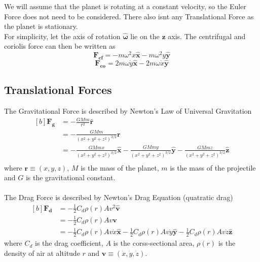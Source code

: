 \documentclass[12pt]{article}
\newcommand{\bs}[1]{\boldsymbol{#1}}
\newcommand{\om}{\omega}
\begin{document}
We will assume that the planet is rotating at a constant velocity, so the Euler Force does not need to be considered. There also isnt any Translational Force as the planet is stationary.\\
For simplicity, let the axis of rotation $\bs{\hat{\om}}$ lie on the $\bs{z}$ axis. The centrifugal and coriolis force can then be written as 
\begin{equation} \bs{F_{cf}} = -m\om^2x\bs{\hat{x}} - m\om^2y\bs{\hat{y}} \end{equation}
\begin{equation} \bs{F_{co}} = 2m\om\dot{y}\bs{\hat{x}} - 2m\om\dot{x}\bs{\hat{y}}\end{equation}

\subsection{Translational Forces}
The Gravitational Force is described by Newton's Law of Universal Gravitation
\begin{equation}
\begin{aligned}[b]
\bs{F_g} &= -\frac{GMm}{r^2}\bs{\hat{r}}\\
&= -\frac{GMm}{(x^2+y^2+z^2)^{3/2}}\bs{r}\\
&= -\frac{GMmx}{(x^2+y^2+z^2)^{3/2}}\bs{\hat{x}} -\frac{GMmy}{(x^2+y^2+z^2)^{3/2}}\bs{\hat{y}} -\frac{GMmz}{(x^2+y^2+z^2)^{3/2}}\bs{\hat{z}}\\
\end{aligned}
\end{equation}
where $\bs{r} \equiv (x, y, z)$, $M$ is the mass of the planet, $m$ is the mass of the projectile and $G$ is the gravitational constant.\\
\\
The Drag Force is described by Newton's Drag Equation (quatratic drag)
\begin{equation}
\begin{aligned}[b]
\bs{F_d} &= -\frac{1}{2}C_d\rho(r)Av^2\bs{\hat{v}}\\
&= -\frac{1}{2}C_d\rho(r)Av\bs{v}\\
&= -\frac{1}{2}C_d\rho(r)Av\dot{x}\bs{\hat{x}} - \frac{1}{2}C_d\rho(r)Av\dot{y}\bs{\hat{y}} - \frac{1}{2}C_d\rho(r)Av\dot{z}\bs{\hat{z}}
\end{aligned}
\end{equation}
where $C_d$ is the drag coefficient, $A$ is the corss-sectional area, $\rho(r)$ is the density of air at altitude $r$ and $\bs{v} \equiv (\dot{x}, \dot{y}, \dot{z})$.
\end{document}
